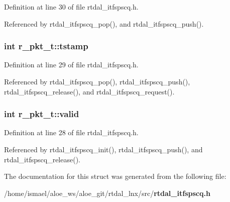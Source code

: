 Definition at line 30 of file rtdal\-\_\-itfspscq.\-h.



Referenced by rtdal\-\_\-itfspscq\-\_\-pop(), and rtdal\-\_\-itfspscq\-\_\-push().

\subsubsection[{tstamp}]{\setlength{\rightskip}{0pt plus 5cm}int r\-\_\-pkt\-\_\-t\-::tstamp}\label{structr__pkt__t_a0d4ff9e1354844e0d83eb14ebad1b309}


Definition at line 29 of file rtdal\-\_\-itfspscq.\-h.



Referenced by rtdal\-\_\-itfspscq\-\_\-pop(), rtdal\-\_\-itfspscq\-\_\-push(), rtdal\-\_\-itfspscq\-\_\-release(), and rtdal\-\_\-itfspscq\-\_\-request().

\subsubsection[{valid}]{\setlength{\rightskip}{0pt plus 5cm}int r\-\_\-pkt\-\_\-t\-::valid}\label{structr__pkt__t_a22af5ea9cd0dc91928651e046400dc51}


Definition at line 28 of file rtdal\-\_\-itfspscq.\-h.



Referenced by rtdal\-\_\-itfspscq\-\_\-init(), rtdal\-\_\-itfspscq\-\_\-push(), and rtdal\-\_\-itfspscq\-\_\-release().



The documentation for this struct was generated from the following file\-:\begin{DoxyCompactItemize}
\item 
/home/ismael/aloe\-\_\-ws/aloe\-\_\-git/rtdal\-\_\-lnx/src/{\bf rtdal\-\_\-itfspscq.\-h}\end{DoxyCompactItemize}
